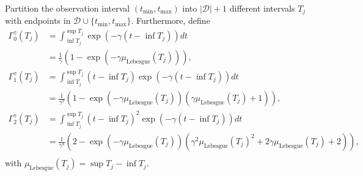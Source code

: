 \documentclass[honours,12pt]{unswthesis}
\numberwithin{equation}{section}
\begin{document}
Partition the observation interval $(t_\mathrm{min},t_\mathrm{max})$ into $\vert\mathcal{D}\vert+1$ different intervals $T_j$ with endpoints in $\mathcal{D}\cup\{t_\mathrm{min},t_\mathrm{max}\}$. Furthermore, define
\begin{equation}
	\begin{align}
		\Gamma_0^\gamma(T_j) &= \int_{\inf T_j}^{\sup T_j}\exp(-\gamma (t-\inf T_j))dt \\
		&= \frac{1}{\gamma} (1 - \exp(-\gamma \mu_\mathrm{Lebesgue}(T_j))), \\
		\Gamma_1^\gamma(T_j) &= \int_{\inf T_j}^{\sup T_j}(t-\inf T_j)\exp(-\gamma (t-\inf T_j))dt \\
		&= \frac{1}{\gamma^2} (1 - \exp(-\gamma \mu_\mathrm{Lebesgue}(T_j))(\gamma \mu_\mathrm{Lebesgue}(T_j) + 1)), \\
		\Gamma_2^\gamma(T_j) &= \int_{\inf T_j}^{\sup T_j}(t-\inf T_j)^2\exp(-\gamma (t-\inf T_j))dt \\
		&= \frac{1}{\gamma^3} (2 - \exp(-\gamma \mu_\mathrm{Lebesgue}(T_j))(\gamma^2\mu_\mathrm{Lebesgue}(T_j)^2+2\gamma \mu_\mathrm{Lebesgue}(T_j)+2)), \\
	\end{align}
\end{equation}
with $\mu_\mathrm{Lebesgue}(T_j) = \sup T_j - \inf T_j$.
\end{document}
